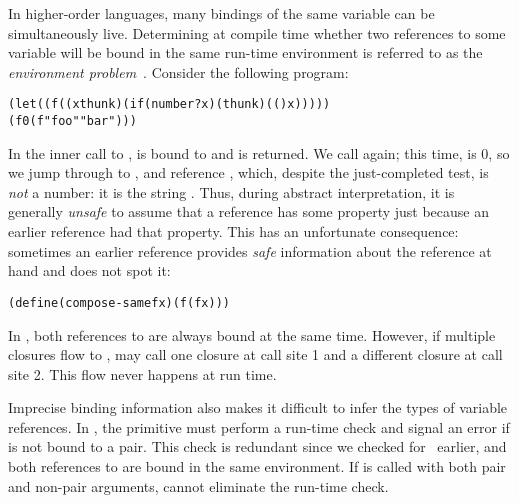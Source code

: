\documentclass{LMCS}
\theoremstyle{definition} \newtheorem{property}[thm]{Property}
\begin{document}
In higher-order languages, many bindings of the same variable can be 
simultaneously live.
Determining at compile time whether two references to some variable will be 
bound in the same run-time environment is referred to as 
the \emph{environment problem}~\cite{diss/cmu/91/olin}.
Consider the following program:
\begin{center}
  \begin{minipage}{0.8\columnwidth}
    \begin{alltt}
(let ((f (\lam(x thunk) (if (number? x) (thunk) (() x)))))
  (f 0 (f "foo" "bar"))) \end{alltt}    
  \end{minipage}
\end{center}
In the inner call to ,  is bound to  and  is 
returned.
We call  again; this time,  is 0, so we jump through  to
, and reference , which, despite the just-completed 
test, is \emph{not} a number: it is the string .
Thus, during abstract interpretation, it is gen\-er\-al\-ly \emph{unsafe} to 
assume that a reference has some property just because an ear\-li\-er reference
had that property.
This has an unfortunate consequence: sometimes an ear\-li\-er reference provides
\emph{safe} information about the reference at hand and \kcfa{} does not spot 
it:
\begin{center}
  \begin{minipage}{0.55\columnwidth}
    \begin{alltt}
(define (compose-same f x) (f (f x))) \end{alltt}    
  \end{minipage}
\end{center}
In , both references to  are always bound at the same 
time.
However, if multiple closures flow to , {\kcfa} may call one closure at
call site 1 and a different closure at call site 2.
This flow never happens at run time.

Imprecise binding information also makes it difficult to infer the types of
variable references.
In , the  primitive must perform a run-time check and signal an
error if  is not bound to a pair.
This check is redundant since we checked for \ earlier, and both 
ref\-er\-ences to  are bound in the same environment.
If  is called with both pair and non-pair arguments, \kcfa{} cannot
eliminate the run-time check.
\end{document}
